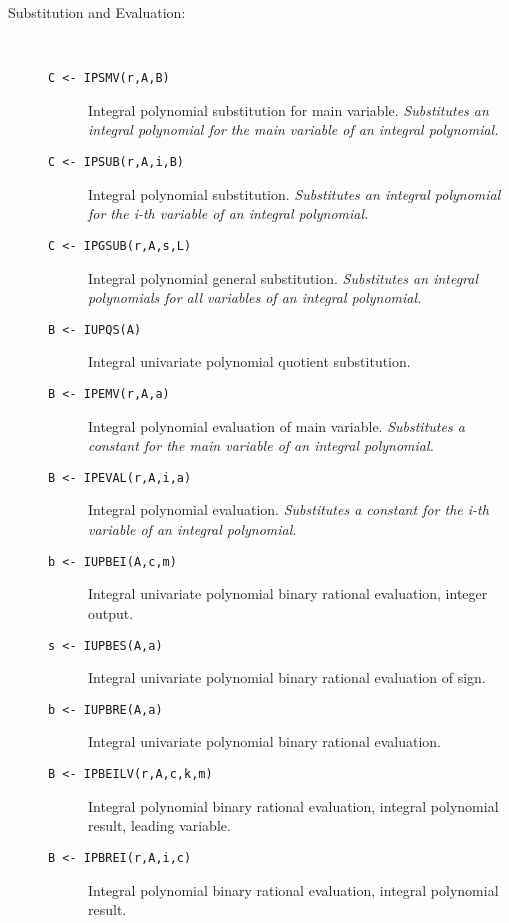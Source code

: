 \begin{description}
\begin{description}
  \end{description}

\item[Substitution and Evaluation:] \ \
  \begin{description}
  \item[{\tt C <- IPSMV(r,A,B) 
}]  Integral polynomial substitution for main variable. {\em
    Substitutes an integral polynomial for the main variable of an integral
    polynomial.}
  \item[{\tt C <- IPSUB(r,A,i,B) 
}]  Integral polynomial substitution. {\em Substitutes an
    integral polynomial for the i-th variable of an integral polynomial.}
  \item[{\tt C <- IPGSUB(r,A,s,L) 
}]  Integral polynomial general substitution. {\em Substitutes
    an integral polynomials for all variables of an integral polynomial.}
  \item[{\tt B <- IUPQS(A) 
}]  Integral univariate polynomial quotient substitution.
  \item[{\tt B <- IPEMV(r,A,a) 
}]  Integral polynomial evaluation of main variable. {\em
    Substitutes a constant for the main variable of an integral
    polynomial.}
  \item[{\tt B <- IPEVAL(r,A,i,a) 
}]  Integral polynomial evaluation. {\em Substitutes a
    constant for the i-th variable of an integral polynomial.}
  \item[{\tt b <- IUPBEI(A,c,m) 
}]  Integral univariate polynomial binary rational evaluation,
    integer output.
  \item[{\tt s <- IUPBES(A,a) 
}]  Integral univariate polynomial binary rational evaluation of
    sign.
  \item[{\tt b <- IUPBRE(A,a) 
}]  Integral univariate polynomial binary rational evaluation.
  \item[{\tt B <- IPBEILV(r,A,c,k,m)
}] Integral polynomial binary rational evaluation, integral
    polynomial result, leading variable.
  \item[{\tt B <- IPBREI(r,A,i,c)
}]  Integral polynomial binary rational evaluation, integral
    polynomial result.

  \end{description}


\end{description}
